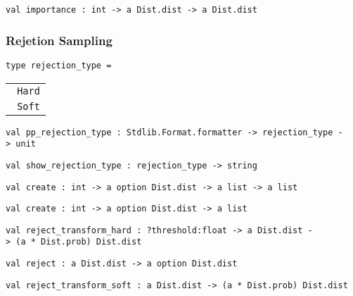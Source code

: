 \protect\hyperlink{val-importanceux27}{}\texttt{val\ importance\textquotesingle{}\ :\ int\ -\textgreater{}\ \textquotesingle{}a\ Dist.dist\ -\textgreater{}\ \textquotesingle{}a\ Dist.dist}

\hypertarget{rejux5fhelpers}{\subsubsection{\texorpdfstring{\protect\hyperlink{rejux5fhelpers}{}Rejetion
Sampling}{Rejetion Sampling}}\label{rejux5fhelpers}}

\protect\hyperlink{type-rejectionux5ftype}{}\texttt{type\ rejection\_type}\texttt{\ =\ }

\begin{longtable}[c]{@{}l@{}}
\toprule
\protect\hyperlink{type-rejectionux5ftype.Hard}{}\texttt{\textbar{}\ }\texttt{Hard}\tabularnewline
\protect\hyperlink{type-rejectionux5ftype.Soft}{}\texttt{\textbar{}\ }\texttt{Soft}\tabularnewline
\bottomrule
\end{longtable}

\protect\hyperlink{val-ppux5frejectionux5ftype}{}\texttt{val\ pp\_rejection\_type\ :\ Stdlib.Format.formatter\ -\textgreater{}\ rejection\_type\ -\textgreater{}\ unit}

\protect\hyperlink{val-showux5frejectionux5ftype}{}\texttt{val\ show\_rejection\_type\ :\ rejection\_type\ -\textgreater{}\ string}

\protect\hyperlink{val-createux27}{}\texttt{val\ create\textquotesingle{}\ :\ int\ -\textgreater{}\ \textquotesingle{}a\ option\ Dist.dist\ -\textgreater{}\ \textquotesingle{}a\ list\ -\textgreater{}\ \textquotesingle{}a\ list}

\protect\hyperlink{val-create}{}\texttt{val\ create\ :\ int\ -\textgreater{}\ \textquotesingle{}a\ option\ Dist.dist\ -\textgreater{}\ \textquotesingle{}a\ list}

\protect\hyperlink{val-rejectux5ftransformux5fhard}{}\texttt{val\ reject\_transform\_hard\ :\ ?⁠threshold:float\ -\textgreater{}\ \textquotesingle{}a\ Dist.dist\ -\textgreater{}\ (\textquotesingle{}a\ *\ Dist.prob)\ Dist.dist}

\protect\hyperlink{val-rejectux27ux27}{}\texttt{val\ reject\textquotesingle{}\textquotesingle{}\ :\ \textquotesingle{}a\ Dist.dist\ -\textgreater{}\ \textquotesingle{}a\ option\ Dist.dist}

\protect\hyperlink{val-rejectux5ftransformux5fsoft}{}\texttt{val\ reject\_transform\_soft\ :\ \textquotesingle{}a\ Dist.dist\ -\textgreater{}\ (\textquotesingle{}a\ *\ Dist.prob)\ Dist.dist}

